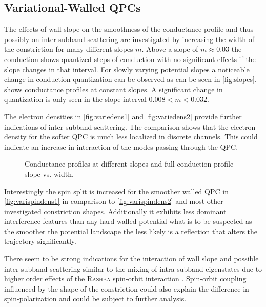 \subsection{Variational-Walled QPCs}
The effects of wall slope on the smoothness of the conductance profile and thus possibly on inter-subband scattering are investigated by increasing the width of the constriction for many different slopes $m$. Above a slope of $m \approx 0.03$ the conduction shows quantized steps of conduction with no significant effects if the slope changes in that interval. For slowly varying potential slopes a noticeable change in conduction quantization can be observed as can be seen in \cref{fig:slopes}.  shows conductance profiles at constant slopes. A significant change in quantization is only seen in the slope-interval $0.008 \lt m \lt 0.032$.\par
The electron densities in \cref{fig:variedens1} and \cref{fig:variedens2} provide further indications of inter-subband scattering. The comparison shows that the electron density for the softer QPC is much less localized in discrete channels. This could indicate an increase in interaction of the modes passing through the QPC.\par
\begin{figure}[h] 
\centering
{}
\caption{Conductance profiles at different slopes and full conduction profile slope vs. width.}\label{fig:conductances}
\end{figure}
Interestingly the spin split is increased for the smoother walled QPC in \cref{fig:varispindens1} in comparison to \cref{fig:varispindens2} and most other investigated constriction shapes. Additionally it exhibits less dominant interference features than any hard walled potential what is to be suspected as the smoother the potential landscape the less likely is a reflection that alters the trajectory significantly.\par
There seem to be strong indications for the interaction of wall slope and possible inter-subband scattering similar to the mixing of intra-subband eigenstates due to higher order effects of the \textsc{Rashba} spin-orbit interaction \cite{Wolfgang2003PhysicaE.18.337}. Spin-orbit coupling influenced by the shape of the constriction could also explain the difference in spin-polarization and could be subject to further analysis.
